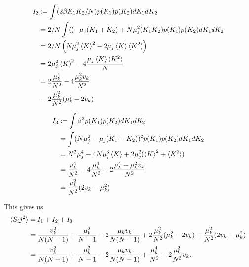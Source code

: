 \documentclass{article}
\begin{document}
\begin{align}
    I_2 &:= \int (2\beta K_1 K_2/N) p(K_1) p(K_2) dK_1 dK_2\\
    &= 2/N \int ((-\mu_j (K_1+K_2) + N \mu_j^2) K_1 K_2) p(K_1) p(K_2) dK_1 dK_2\\
    &=2/N \left ( N \mu_j^2 \braket{K}^2 - 2 \mu_j \braket{K}\braket{K^2} \right )\\
    &= 2 \mu_j^2 \braket{K}^2 - 4 \frac{\mu_j \braket{K}\braket{K^2}}{N}\\
    &= 2 \frac{\mu_k^4}{N^2} - 4 \frac{\mu_k^2 v_k}{N^2}\\
    &= 2 \frac{\mu_k^2}{N^2}(\mu_k^2 - 2 v_k) 
\end{align}

\begin{align}
    I_3 &:= \int \beta^2 p(K_1) p(K_2) dK_1 dK_2\\
    &= \int (N \mu_j^2 - \mu_j (K_1+K_2))^2 p(K_1) p(K_2) dK_1 dK_2\\
    &= N^2 \mu_j^4 - 4 N \mu_j^3 \braket{K} + 2 \mu_j^2 (\braket{K}^2 + \braket{K^2})\\
    &= \frac{\mu_k^4}{N^2} - 4 \frac{\mu_k^4}{N^2} + 2 \frac{\mu_k^4 + \mu_k^2 v_k}{N^2}\\
    &= \frac{\mu_k^2}{N^2}(2 v_k - \mu_k^2)
\end{align}

This gives us
\begin{align}
    \braket{S_ij^2} &= I_1 + I_2 + I_3\\
    &= \frac{v_k^2}{N (N-1)} + \frac{\mu_k^2}{N-1} - 2 \frac{\mu_k v_k}{N (N-1)} + 2 \frac{\mu_k^2}{N^2}(\mu_k^2 - 2 v_k) + \frac{\mu_k^2}{N^2}(2 v_k - \mu_k^2)\\
    &= \frac{v_k^2}{N (N-1)} + \frac{\mu_k^2}{N-1} - 2 \frac{\mu_k v_k}{N (N-1)} + \frac{\mu_k^4}{N^2} - 2 \frac{\mu_k^2}{N^2} v_k.
\end{align}
\end{document}
